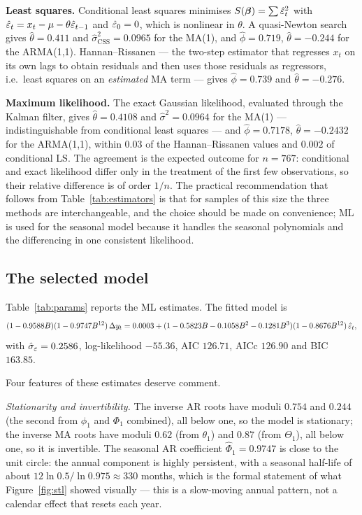 \textbf{Least squares.} Conditional least squares minimises
$S(\bm\beta)=\sum\hat{\varepsilon}_t^2$ with $\hat{\varepsilon}_t = x_t-\mu-\theta\hat{\varepsilon}_{t-1}$
and $\hat{\varepsilon}_0=0$, which is nonlinear in $\theta$. A quasi-Newton search gives
$\hat\theta = 0.411$ and $\hat\sigma^2_{\text{CSS}} = 0.0965$ for the MA(1), and
$\hat\phi=0.719$, $\hat\theta=-0.244$ for the ARMA(1,1). Hannan--Rissanen --- the
two-step estimator that regresses $x_t$ on its own lags to obtain residuals and
then uses those residuals as regressors, i.e.\ least squares on an
\emph{estimated} MA term --- gives $\hat\phi = 0.739$ and $\hat\theta=-0.276$.

\textbf{Maximum likelihood.} The exact Gaussian likelihood, evaluated through the
Kalman filter, gives $\hat\theta = 0.4108$ and $\hat\sigma^2 = 0.0964$ for the
MA(1) --- indistinguishable from conditional least squares --- and
$\hat\phi=0.7178$, $\hat\theta=-0.2432$ for the ARMA(1,1), within $0.03$ of the
Hannan--Rissanen values and $0.002$ of conditional LS. The agreement is the
expected outcome for $n=767$: conditional and exact likelihood differ only in the
treatment of the first few observations, so their relative difference is of order
$1/n$. The practical recommendation that follows from Table~\ref{tab:estimators}
is that for samples of this size the three methods are interchangeable, and the
choice should be made on convenience; ML is used for the seasonal model because it
handles the seasonal polynomials and the differencing in one consistent
likelihood.

\subsection{The selected model}

Table~\ref{tab:params} reports the ML estimates. The fitted model is
\begin{equation}
(1-0.9588 B)(1-0.9747 B^{12})\,\Delta y_t
= 0.0003 + (1-0.5823B-0.1058B^2-0.1281B^3)(1-0.8676 B^{12})\,\hat{\varepsilon}_t ,
\label{eq:fitted}
\end{equation}
with $\hat\sigma_\varepsilon = 0.2586$, log-likelihood $-55.36$, AIC $126.71$, AICc
$126.90$ and BIC $163.85$.



Four features of these estimates deserve comment.

\emph{Stationarity and invertibility.} The inverse AR roots have moduli $0.754$ and
$0.244$ (the second from $\phi_1$ and $\Phi_1$ combined), all below one, so the
model is stationary; the inverse MA roots have moduli $0.62$ (from $\theta_1$) and
$0.87$ (from $\Theta_1$), all below one, so it is invertible. The seasonal AR
coefficient $\hat\Phi_1 = 0.9747$ is close to the unit circle: the annual component
is highly persistent, with a seasonal half-life of about $12\ln 0.5/\ln 0.975
\approx 330$ months, which is the formal statement of what Figure~\ref{fig:stl}
showed visually --- this is a slow-moving annual pattern, not a calendar effect
that resets each year.

